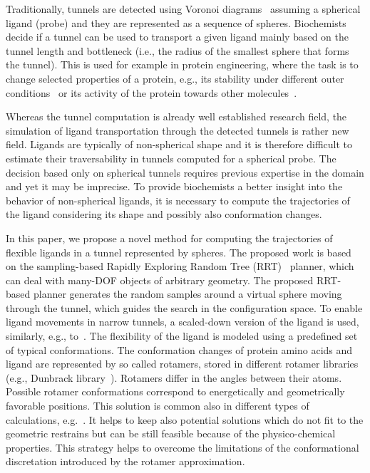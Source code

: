 \documentclass{svmult}
\begin{document}
Traditionally, tunnels are detected using Voronoi diagrams~\cite{yaffe2008,caver3} assuming
 a spherical ligand (probe) and they are represented as a sequence of spheres.
Biochemists decide if a tunnel can be used to transport a given ligand mainly based on the tunnel length and bottleneck (i.e., the radius of the smallest sphere that forms the tunnel).
This is used for example in protein engineering, where the task is to change selected properties of a protein, e.g., its stability under different outer conditions~\cite{Koudelakova2013} or its activity of the protein towards other molecules~\cite{Pavlova2009}.

Whereas the tunnel computation is already well established research field, the simulation of ligand transportation through the detected tunnels is  rather new field.
Ligands are typically of non-spherical shape and it is therefore difficult to estimate their traversability in tunnels computed for a spherical probe.
The decision based only on spherical tunnels requires previous expertise in the domain and yet it may be imprecise.
To provide biochemists a better insight into the behavior of non-spherical ligands, it is necessary to compute the trajectories of the ligand considering its shape and possibly also conformation changes.

In this paper, we propose a novel method for computing the trajectories of flexible ligands in a tunnel represented by spheres.
The proposed work is based on the sampling-based Rapidly Exploring Random Tree (RRT)~\cite{lavalleRRT} planner, which
can deal with many-DOF objects of arbitrary geometry.
The proposed RRT-based planner generates the random samples around a virtual sphere moving through the tunnel, which
guides the search in the configuration space.
To enable ligand movements in narrow tunnels, a scaled-down version of the ligand is used, similarly, e.g., to~\cite{cortes2005path}.
The flexibility of the ligand is modeled using a predefined set of typical conformations.
The conformation changes of protein amino acids and ligand are represented by so called rotamers, stored in different rotamer libraries (e.g., Dunbrack library~\cite{dunbrack}).
Rotamers differ in the angles between their atoms.
Possible rotamer conformations correspond to energetically and geometrically favorable positions.
This solution is common also in different types of calculations, e.g.~\cite{kellogg}. 
It helps to keep also potential solutions which do not fit to the geometric restrains but can be still feasible because of the physico-chemical properties.
This strategy helps to overcome the limitations of the conformational discretation introduced by the rotamer approximation.
\end{document}
